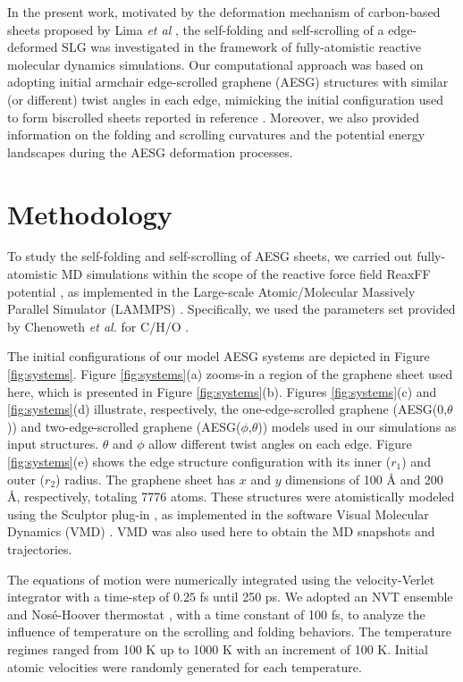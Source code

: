 \documentclass[twoside,twocolumn,9pt]{article}
\begin{document}
In the present work, motivated by the deformation mechanism of carbon-based sheets proposed by Lima \textit{et al} \cite{lima2011biscrolling}, the self-folding and self-scrolling of a edge-deformed SLG was investigated in the framework of fully-atomistic reactive molecular dynamics simulations. Our computational approach was based on adopting initial armchair edge-scrolled graphene (AESG) structures with similar (or different) twist angles in each edge, mimicking the initial configuration used to form biscrolled sheets reported in reference \cite{lima2011biscrolling}. Moreover, we also provided information on the folding and scrolling curvatures and the potential energy landscapes during the AESG deformation processes.   

\section{Methodology}

To study the self-folding and self-scrolling of AESG sheets, we carried out fully-atomistic MD simulations within the scope of the reactive force field ReaxFF potential \cite{vanduin_JPCA,mueller_JPCC}, as implemented in the Large-scale Atomic/Molecular Massively Parallel Simulator (LAMMPS) \cite{plimpton_JCP}. Specifically, we used the parameters set provided by Chenoweth \textit{et al.} for C/H/O \cite{chenoweth2008reaxff}.  

The initial configurations of our model AESG systems are depicted in Figure \ref{fig:systems}. Figure \ref{fig:systems}(a) zooms-in a region of the graphene sheet used here, which is presented in Figure \ref{fig:systems}(b). Figures \ref{fig:systems}(c) and \ref{fig:systems}(d) illustrate, respectively, the one-edge-scrolled graphene (AESG(0,$\theta$)) and two-edge-scrolled graphene (AESG($\phi$,$\theta$)) models used in our simulations as input structures. $\theta$ and $\phi$ allow different twist angles on each edge. Figure \ref{fig:systems}(e) shows the edge structure configuration with its inner ($r_1$) and outer ($r_2$) radius. The graphene sheet has $x$ and $y$ dimensions of 100 \r{A} and 200 \r{A}, respectively, totaling 7776 atoms. These structures were atomistically modeled using the Sculptor plug-in \cite{humphrey_JMG}, as implemented in the software Visual Molecular Dynamics (VMD) \cite{humphrey_JMG}. VMD was also used here to obtain the MD snapshots and trajectories. 

The equations of motion were numerically integrated using the velocity-Verlet integrator with a time-step of $0.25$ fs until 250 ps. We adopted an NVT ensemble and Nos\'e-Hoover thermostat \cite{hoover1985canonical}, with a time constant of 100 fs, to analyze the influence of temperature on the scrolling and folding behaviors. The temperature regimes ranged from 100 K up to 1000 K with an increment of 100 K. Initial atomic velocities were randomly generated for each temperature.   
\end{document}
